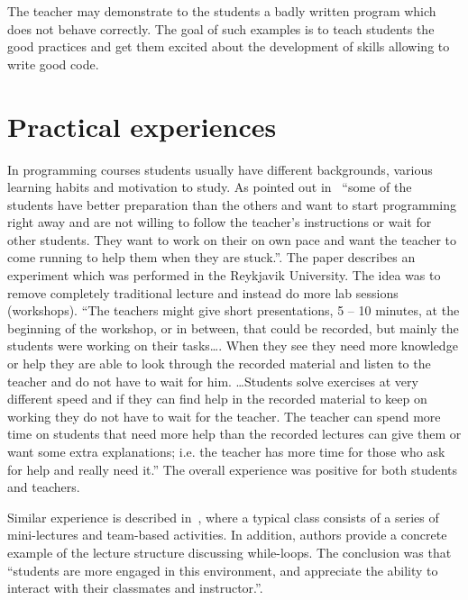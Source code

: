 \documentclass{article}
\begin{document}
The teacher may demonstrate to the students a badly written program which does
not behave correctly. The goal of such examples is to teach students
the good practices and get them excited about the development
of skills allowing to write good code.



\section{Practical experiences}


In programming courses students usually have different backgrounds,
various learning habits and motivation to study. As
pointed out in~\cite{experiment_iceland_2006} ``some of the students
have better preparation than the others and want to start programming
right away and are not willing to follow the teacher's instructions or
wait for other students. They want to work on their on own pace and
want the teacher to come running to help them when they are stuck.''.
The paper describes an experiment which was performed in the Reykjavik
University. The idea was to remove completely traditional lecture and
instead do more lab sessions (workshops). ``The teachers might give
short presentations, 5 – 10 minutes, at the beginning of the workshop,
or in between, that could be recorded, but mainly the students were
working on their tasks\ldots. When they see they need more knowledge
or help they are able to look through the recorded material and listen to the
teacher and do not have to wait for him. \ldots Students solve
exercises at very different speed and if they can find help in the
recorded material to keep on working they do not have to wait for the
teacher. The teacher can spend more time on students that need more
help than the recorded lectures can give them or want some extra
explanations; i.e. the teacher has more time for those who ask for
help and really need it.'' The overall experience was positive for
both students and teachers.

Similar experience is described in~\cite{cordes2002active}, where a
typical class consists of a series of mini-lectures and team-based
activities.  In addition, authors provide a concrete example of the
lecture structure discussing while-loops. The conclusion was that
``students are more engaged in this environment, and appreciate the
ability to interact with their classmates and instructor.''.
\end{document}
